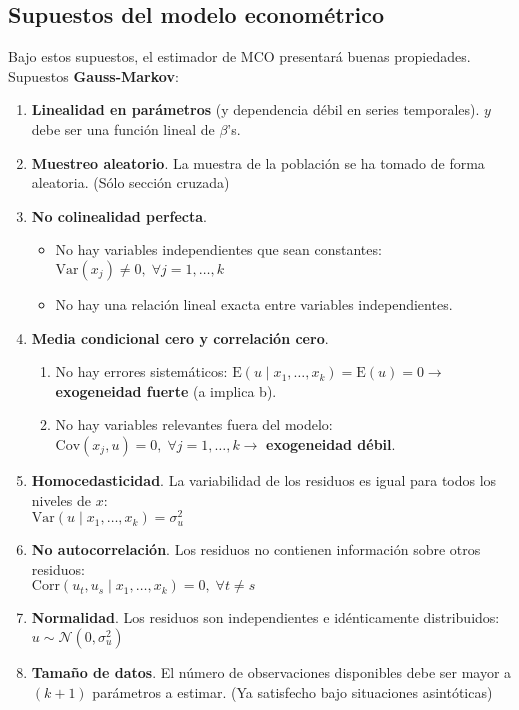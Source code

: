 \documentclass[10pt, a4paper, landscape]{extarticle}
\newcommand{\E}{\mathrm{E}}
\newcommand{\Var}{\mathrm{Var}}
\newcommand{\Cov}{\mathrm{Cov}}
\newcommand{\Corr}{\mathrm{Corr}}
\begin{document}
\begin{multicols}{3}
\subsection*{Supuestos del modelo econométrico}

Bajo estos supuestos, el estimador de MCO presentará buenas propiedades. Supuestos \textbf{Gauss-Markov}:

\begin{enumerate}[leftmargin=*]
	\item \textbf{Linealidad en parámetros} (y dependencia débil en series temporales). $y$ debe ser una función lineal de $\beta$'s.
	\item \textbf{Muestreo aleatorio}. La muestra de la población se ha tomado de forma aleatoria. (Sólo sección cruzada)
	\item \textbf{No colinealidad perfecta}.
	\begin{itemize}[leftmargin=*]
		\item No hay variables independientes que sean constantes: $\Var(x_j) \neq 0, \; \forall j = 1, \ldots, k$
		\item No hay una relación lineal exacta entre variables independientes.
	\end{itemize}
	\item \textbf{Media condicional cero y correlación cero}.
	\begin{enumerate}[leftmargin=*, label=\alph*.]
		\item No hay errores sistemáticos: $\E(u \mid x_1, \ldots, x_k) = \E(u) = 0 \rightarrow$ \textbf{exogeneidad fuerte} (a implica b).
		\item No hay variables relevantes fuera del modelo: $\Cov(x_j, u) = 0, \; \forall j = 1, \ldots, k \rightarrow$ \textbf{exogeneidad débil}.
	\end{enumerate}
	\item \textbf{Homocedasticidad}. La variabilidad de los residuos es igual para todos los niveles de $x$: \\ $\Var(u \mid x_1, \ldots, x_k) = \sigma^2_u$
	\item \textbf{No autocorrelación}. Los residuos no contienen información sobre otros residuos: \\ $\Corr(u_t, u_s \mid x_1, \ldots, x_k) = 0, \; \forall t \neq s$
	\item \textbf{Normalidad}. Los residuos son independientes e idénticamente distribuidos: $u \sim \mathcal{N} (0, \sigma^2_u)$
	\item \textbf{Tamaño de datos}. El número de observaciones disponibles debe ser mayor a $(k + 1)$ parámetros a estimar. (Ya satisfecho bajo situaciones asintóticas)
\end{enumerate}


\end{multicols}
\end{document}
